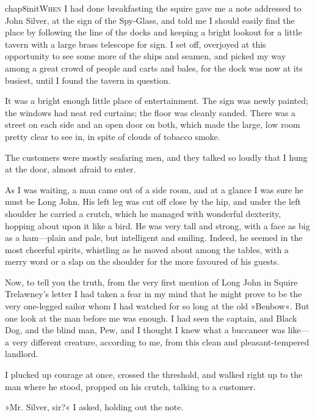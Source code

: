 
\lettrine[lines=5,image=true,findent=2pt]{chap8initW}{hen} I had done breakfasting the squire gave me a note addressed to John Silver, at the sign of the Spy-Glass, and told me I should easily find the place by following the line of the docks and keeping a bright lookout for a little tavern with a large brass telescope for sign. I set off, overjoyed at this opportunity to see some more of the ships and seamen, and picked my way among a great crowd of people and carts and bales, for the dock was now at its busiest, until I found the tavern in question.

It was a bright enough little place of entertainment. The sign was newly painted; the windows had neat red curtains; the floor was cleanly sanded. There was a street on each side and an open door on both, which made the large, low room pretty clear to see in, in spite of clouds of tobacco smoke.

The customers were mostly seafaring men, and they talked so loudly that I hung at the door, almost afraid to enter.

As I was waiting, a man came out of a side room, and at a glance I was sure he must be Long John. His left leg was cut off close by the hip, and under the left shoulder he carried a crutch, which he managed with wonderful dexterity, hopping about upon it like a bird. He was very tall and strong, with a face as big as a ham—plain and pale, but intelligent and smiling. Indeed, he seemed in the most cheerful spirits, whistling as he moved about among the tables, with a merry word or a slap on the shoulder for the more favoured of his guests.

Now, to tell you the truth, from the very first mention of Long John in Squire Trelawney's letter I had taken a fear in my mind that he might prove to be the very one-legged sailor whom I had watched for so long at the old »Benbow«. But one look at the man before me was enough. I had seen the captain, and Black Dog, and the blind man, Pew, and I thought I knew what a buccaneer was like—a very different creature, according to me, from this clean and pleasant-tempered landlord.

I plucked up courage at once, crossed the threshold, and walked right up to the man where he stood, propped on his crutch, talking to a customer.

»Mr. Silver, sir?« I asked, holding out the note.

